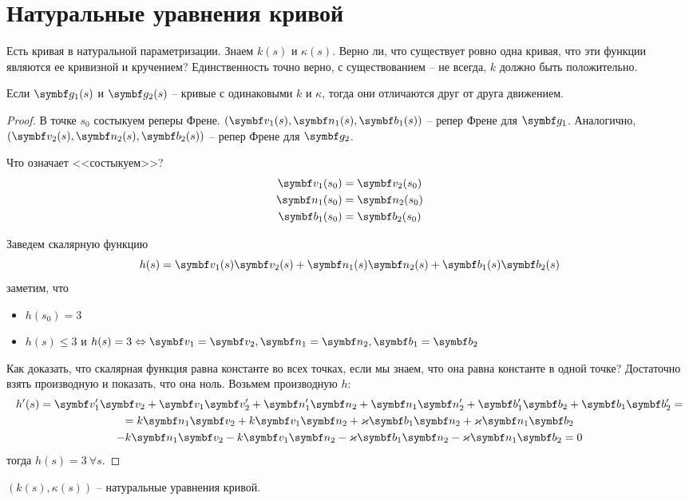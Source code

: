 \documentclass[main]{subfiles}
\begin{document}
\chapter{Натуральные уравнения кривой}

Есть кривая в натуральной параметризации.
Знаем $k(s)$ и $\kappa(s)$.
Верно ли, что существует ровно одна кривая, что эти функции являются ее кривизной и кручением?
Единственность точно верно, с существованием -- не всегда, $k$ должно быть положительно.

\begin{theorem}
    Если $\vg_1(s)$ и $\vg_2(s)$ -- кривые с одинаковыми $k$ и $\kappa$, тогда они отличаются друг от друга движением.
\end{theorem}
\begin{proof}
    В точке $s_0$ состыкуем реперы Френе.
    $(\vv_1(s), \vn_1(s), \vb_1(s))$ -- репер Френе для $\vg_1$.
    Аналогично, $(\vv_2(s), \vn_2(s), \vb_2(s))$ -- репер Френе для $\vg_2$.

    Что означает <<состыкуем>>?
    \begin{gather*}
        \vv_1 (s_0) = \vv_2(s_0)\\
        \vn_1 (s_0) = \vn_2(s_0)\\
        \vb_1 (s_0) = \vb_2(s_0)
    \end{gather*}

    Заведем скалярную функцию
    \[h(s) = \vv_1(s) \vv_2(s) + \vn_1(s) \vn_2(s) + \vb_1(s) \vb_2(s)\]
    заметим, что
    \begin{itemize}
        \item $h(s_0) = 3$
        \item $h(s) \le 3$ и $h(s) = 3 \Leftrightarrow \vv_1 = \vv_2, \vn_1 = \vn_2, \vb_1 = \vb_2$
    \end{itemize}
    Как доказать, что скалярная функция равна константе во всех точках, если мы знаем, что она равна константе в одной точке?
    Достаточно взять производную и показать, что она ноль.
    Возьмем производную $h$:
    \begin{multline*}
        h'(s) = \vv_1' \vv_2 + \vv_1 \vv_2' + \vn_1' \vn_2 + \vn_1 \vn_2' + \vb_1' \vb_2 + \vb_1 \vb_2' = \\
        = k \vn_1 \vv_2 + k \vv_1 \vn_2  + \kappa \vb_1 \vn_2 + \kappa \vn_1 \vb_2\\
        - k \vn_1 \vv_2 - k \vv_1 \vn_2  - \kappa \vb_1 \vn_2 - \kappa \vn_1 \vb_2 = 0
    \end{multline*}
    тогда $h(s) = 3 \ \forall s$.
\end{proof}
\begin{definition}
    $(k(s), \kappa(s))$ -- натуральные уравнения кривой.
\end{definition}
\end{document}
